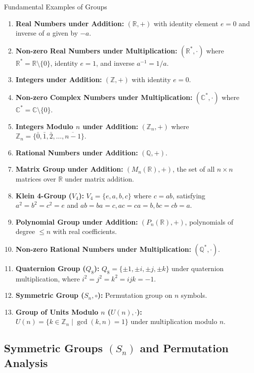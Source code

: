 \documentclass[11pt,a4paper]{article}
\begin{document}
\begin{formulabox}{Fundamental Examples of Groups}
\begin{enumerate}
    \item \textbf{Real Numbers under Addition:} $(\mathbb{R}, +)$ with identity element $e = 0$ and inverse of $a$ given by $-a$.
    \item \textbf{Non-zero Real Numbers under Multiplication:} $(\mathbb{R}^*, \cdot)$ where $\mathbb{R}^* = \mathbb{R} \setminus \{0\}$, identity $e = 1$, and inverse $a^{-1} = 1/a$.
    \item \textbf{Integers under Addition:} $(\mathbb{Z}, +)$ with identity $e = 0$.
    \item \textbf{Non-zero Complex Numbers under Multiplication:} $(\mathbb{C}^*, \cdot)$ where $\mathbb{C}^* = \mathbb{C} \setminus \{0\}$.
    \item \textbf{Integers Modulo $n$ under Addition:} $(\mathbb{Z}_n, +)$ where $\mathbb{Z}_n = \{\bar{0}, \bar{1}, \bar{2}, \dots, \overline{n-1}\}$.
    \item \textbf{Rational Numbers under Addition:} $(\mathbb{Q}, +)$.
    \item \textbf{Matrix Group under Addition:} $(M_n(\mathbb{R}), +)$, the set of all $n \times n$ matrices over $\mathbb{R}$ under matrix addition.
    \item \textbf{Klein 4-Group ($V_4$):} $V_4 = \{e, a, b, c\}$ where $c = ab$, satisfying $a^2 = b^2 = c^2 = e$ and $ab = ba = c, ac = ca = b, bc = cb = a$.
    \item \textbf{Polynomial Group under Addition:} $(P_n(\mathbb{R}), +)$, polynomials of degree $\le n$ with real coefficients.
    \item \textbf{Non-zero Rational Numbers under Multiplication:} $(\mathbb{Q}^*, \cdot)$.
    \item \textbf{Quaternion Group ($Q_8$):} $Q_8 = \{\pm 1, \pm i, \pm j, \pm k\}$ under quaternion multiplication, where $i^2 = j^2 = k^2 = ijk = -1$.
    \item \textbf{Symmetric Group ($S_n, \circ$):} Permutation group on $n$ symbols.
    \item \textbf{Group of Units Modulo $n$ ($U(n), \cdot$):} $U(n) = \{ k \in \mathbb{Z}_n \mid \gcd(k, n) = 1 \}$ under multiplication modulo $n$.
\end{enumerate}
\end{formulabox}

\subsection{Symmetric Groups \texorpdfstring{$(S_n)$}{(Sn)} and Permutation Analysis}
\end{document}
